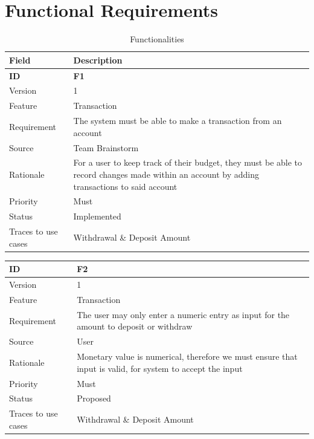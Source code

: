 \documentclass[12pt]{article}
\begin{document}
\section{Functional Requirements}
\begin{table}[H]
\caption{Functionalities}
  \begin{center}
    \begin{tabular}{|l|p{10cm}|}
      \hline
      Field & Description\\
      \hline\hline
      \bf ID & \bf {F1}\\
      \hline
      Version & 1\\
      \hline
      Feature & Transaction\\
      \hline
      Requirement & The system must be able to make a transaction from an account\\
      \hline
      Source & Team Brainstorm\\
      \hline
      Rationale & For a user to keep track of their budget, they must be able to record changes made within an account by adding transactions to said account\\
      \hline
      Priority & Must\\
      \hline
      Status & Implemented\\
      \hline
      Traces to use cases & Withdrawal \& Deposit Amount\\
      \hline
    \end{tabular}
  \end{center}
\end{table}
\begin{table}
  \begin{center}
    \begin{tabular}{|l|p{10cm}|}
      \hline
      \bf ID & \bf {F2}\\
      \hline
      Version & 1\\
      \hline
      Feature & Transaction\\
      \hline
      Requirement & The user may only enter a numeric entry as input for the amount to deposit or withdraw\\
      \hline
      Source & User\\
      \hline
      Rationale & Monetary value is numerical, therefore we must ensure that input is valid, for system to accept the input\\
      \hline
      Priority & Must\\
      \hline
      Status & Proposed\\
      \hline
      Traces to use cases & Withdrawal \& Deposit Amount\\
      \hline
    \end{tabular}
  \end{center}
\end{table}
\end{document}
